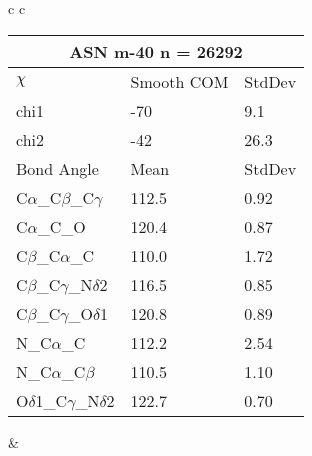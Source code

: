 \begin{longtable}{ c c }
\begin{tabular}{ l l l }
  \toprule
  \multicolumn{3}{c}{ASN \textbf{m-40} n = 26292} \\ \toprule
  $\chi$       & Smooth COM & StdDev \\ \midrule
  chi1 & -70 & 9.1 \\ 
  chi2 & -42 & 26.3 \\ \midrule
  Bond Angle   & Mean     & StdDev \\ \midrule
  C$\alpha$\_C$\beta$\_C$\gamma$ & 112.5 & 0.92\\
  C$\alpha$\_C\_O & 120.4 & 0.87\\
  C$\beta$\_C$\alpha$\_C & 110.0 & 1.72\\
  C$\beta$\_C$\gamma$\_N$\delta$2 & 116.5 & 0.85\\
  C$\beta$\_C$\gamma$\_O$\delta$1 & 120.8 & 0.89\\
  N\_C$\alpha$\_C & 112.2 & 2.54\\
  N\_C$\alpha$\_C$\beta$ & 110.5 & 1.10\\
  O$\delta$1\_C$\gamma$\_N$\delta$2 & 122.7 & 0.70\\
  \bottomrule
  \end{tabular}
  &
  \\
  
\end{longtable}

\newpage

